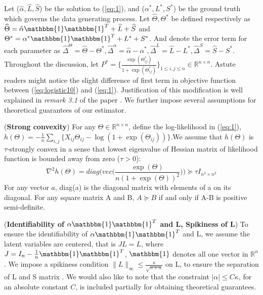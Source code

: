 \documentclass[AMS,STIX1COL]{WileyNJD-v2}
\begin{document}
Let ($\hat{\alpha},\widehat{L},\widehat{S}$) be the solution to (\ref{eq:1}), and ($\alpha^{*},L^{*},S^{*}$) be the ground truth which governs the data generating process.
Let $\widehat{\Theta},\Theta^{*}$ be defined respectively as $\widehat{\Theta} = \hat{\alpha}\mathbbm{1}\mathbbm{1}^T+\widehat{L}+\widehat{S}$ and $\Theta^{*} = \alpha^{*}\mathbbm{1}\mathbbm{1}^T+L^{*}+S^{*}$.
And denote the error term for each parameter as $\widehat{\Delta}^{\Theta} = \widehat{\Theta}-\Theta^{*}, 
\hat{\Delta}^{\alpha} = \hat{\alpha}-\alpha^{*},
\widehat{\Delta}^L = \widehat{L}-L^{*},
\widehat{\Delta}^S = \widehat{S}-S^{*}.$
Throughout the discussion, let $P^{*}=\big\{\frac{\exp(\Theta_{ij}^{*})}{1+\exp(\Theta_{ij}^{*})}\big\}_{1 \leq i,j \leq n} \in \mathbb{R}^{n \times n}$.
Astute readers might notice the slight difference of first term in objective function between (\ref{eq:logistic10})
and (\ref{eq:1}). 
Justification of this modification is well explained in \emph{remark 3.1} of the paper \cite{ma2017exploration}. 
We further impose several assumptions for theoretical guarantees of our estimator.

\begin{assumption}(\textbf{Strong convexity})  \label{Ass:1}
For any $\Theta \in \mathbb{R}^{n\times n}$, define the log-likelihood in (\ref{eq:1}), $h(\Theta) = -\frac{1}{n}\sum_{i,j} \big\{ X_{ij}\Theta_{ij} - \log(1+\exp(\Theta_{ij})) \big\}$.We assume that $h(\Theta)$ is $\tau$-strongly convex in a sense that lowest eigenvalue of Hessian matrix of likelihood function is bounded away from zero ($\tau > 0$):
\[
\nabla^{2}h(\Theta) = diag\Big(vec\Big(\frac{\exp(\Theta)}{n(1+\exp(\Theta))^{2}}
\Big)\Big) \succcurlyeq \tau I_{n^{2} \times n^{2}}
\]
For any vector $a$, diag(a) is the diagonal matrix with elements of a on its diagonal. For any square matrix A and B, $ A \succcurlyeq B $ if and only if A-B is positive semi-definite.
\end{assumption}

\begin{assumption} (\textbf{Identifiability of $\alpha\mathbbm{1}\mathbbm{1}^T$ and L, Spikiness of L}) \label{Ass:2}
To ensure the identifiability of $\alpha\mathbbm{1}\mathbbm{1}^T$ and L, we assume the latent variables are centered, that is $JL=L$, where $J=I_{n}-\frac{1}{n}\mathbbm{1}\mathbbm{1}^T$, $\mathbbm{1}$ denotes all one vector in $\mathbb{R}^{n}$. We impose a spikiness condition $\|L\|_{\infty}\leq\frac{\kappa}{\sqrt{n \times n}}$ on L, to ensure the separation of L and S matrix \cite{agarwal2012noisy}. We would also like to note that the constraint $|\alpha|\leq C\kappa$, for an absolute constant $C$, is included partially for obtaining theoretical guarantees.
\end{assumption}
\end{document}
